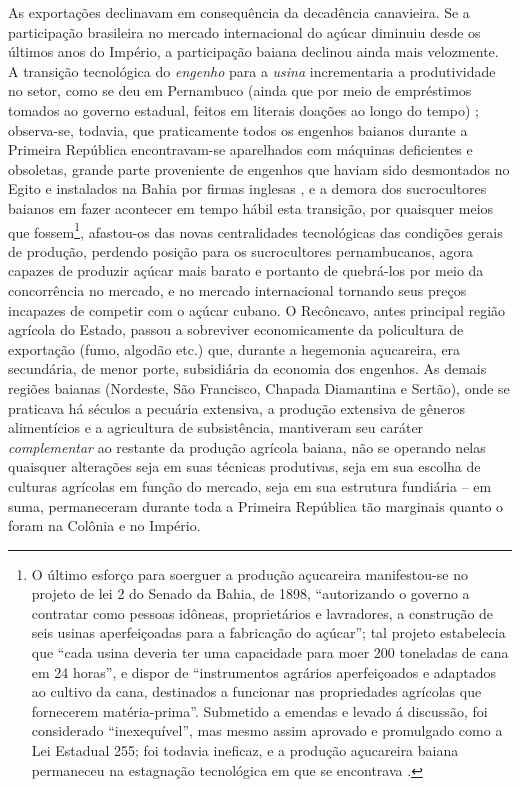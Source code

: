 As exportações declinavam em consequência da decadência canavieira. Se a participação brasileira no mercado internacional do açúcar diminuiu desde os últimos anos do Império, a participação baiana declinou ainda mais velozmente. A transição tecnológica do \textit{engenho} para a \textit{usina} incrementaria a produtividade no setor, como se deu em Pernambuco (ainda que por meio de empréstimos tomados ao governo estadual, feitos em literais doações ao longo do tempo) \cite[p.~31]{gorender_burguesia_1990}; observa-se, todavia, que praticamente todos os engenhos baianos durante a Primeira República encontravam-se aparelhados com máquinas deficientes e obsoletas, grande parte proveniente de engenhos que haviam sido desmontados no Egito e instalados na Bahia por firmas inglesas \cite[p.~74]{sampaio_legislativo_1985}, e a demora dos sucrocultores baianos em fazer acontecer em tempo hábil esta transição, por quaisquer meios que fossem\footnote{O último esforço para soerguer a produção açucareira manifestou-se no projeto de lei 2 do Senado da Bahia, de 1898, ``autorizando o governo a contratar como pessoas idôneas, proprietários e lavradores, a construção de seis usinas aperfeiçoadas para a fabricação do açúcar''; tal projeto estabelecia que ``cada usina deveria ter uma capacidade para moer 200 toneladas de cana em 24 horas'', e dispor de ``instrumentos agrários aperfeiçoados e adaptados ao cultivo da cana, destinados a funcionar nas propriedades agrícolas que fornecerem matéria-prima''. Submetido a emendas e levado á discussão, foi considerado ``inexequível'', mas mesmo assim aprovado e promulgado como a Lei Estadual 255; foi todavia ineficaz, e a produção açucareira baiana permaneceu na estagnação tecnológica em que se encontrava \cite[pp.~74-75]{sampaio_legislativo_1985}.}, afastou-os das novas centralidades tecnológicas das condições gerais de produção, perdendo posição para os sucrocultores pernambucanos, agora capazes de produzir açúcar mais barato e portanto de quebrá-los por meio da concorrência no mercado, e no mercado internacional tornando seus preços incapazes de competir com o açúcar cubano. O Recôncavo, antes principal região agrícola do Estado, passou a sobreviver economicamente da policultura de exportação (fumo, algodão etc.) que, durante a hegemonia açucareira, era secundária, de menor porte, subsidiária da economia dos engenhos. As demais regiões baianas (Nordeste, São Francisco, Chapada Diamantina e Sertão), onde se praticava há séculos a pecuária extensiva, a produção extensiva de gêneros alimentícios e a agricultura de subsistência, mantiveram seu caráter \textit{complementar} ao restante da produção agrícola baiana, não se operando nelas quaisquer alterações seja em suas técnicas produtivas, seja em sua escolha de culturas agrícolas em função do mercado, seja em sua estrutura fundiária -- em suma, permaneceram durante toda a Primeira República tão marginais quanto o foram na Colônia e no Império. 

